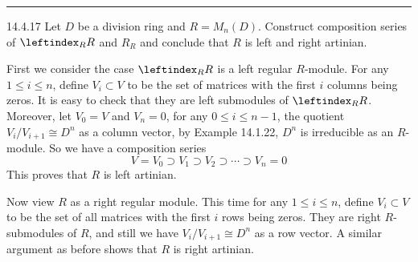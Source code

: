 \documentclass[a4paper, 12pt]{article}
\begin{document}
\noindent\rule{7in}{2.8pt}
\begin{problem}{14.4.17}
Let \(D\) be a division ring and \(R=M_n(D)\). Construct composition series of \(\leftindex_R R\) and \(R_R\) and conclude that \(R\) is left and right artinian.
\end{problem}
\begin{solution}
First we consider the case \(\leftindex_R R\) is a left regular \(R\)-module. For any \(1\leq i\leq n\), define \(V_i\subset V\) to be the set of matrices with the first \(i\) columns being zeros. It is easy to check that they are 
left submodules of \(\leftindex_R R\). Moreover, let \(V_0=V\) and \(V_n=0\), for any \(0\leq i\leq n-1\), the quotient \(V_i/V_{i+1}\cong D^n\) as a column vector, by Example 14.1.22, \(D^n\) is irreducible as an \(R\)-module. So we have a composition 
series 
\[V=V_0\supset V_1\supset V_2\supset \cdots\supset V_n=0\]
This proves that \(R\) is left artinian. 

Now view \(R\) as a right regular module. This time for any \(1\leq i\leq n\), define \(V_i\subset V\) to be the set of all matrices with the first \(i\) rows being zeros. They are right \(R\)-submodules of \(R\), and still we have \(V_i/V_{i+1}\cong D^n\) as a row vector. A 
similar argument as before shows that \(R\) is right artinian.
\end{solution}
\end{document}
